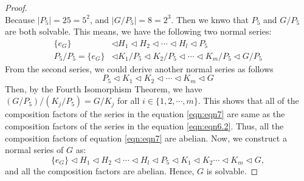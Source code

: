 \begin{answer}
\begin{proof}
\begin{equation}
        \end{equation}
        Because $\lvert P_5 \rvert = 25 = 5^2$, and $\lvert G/P_5 \rvert = 8 = 2^3$. Then we knwo that $P_5$ and $G/P_5$ are both solvable. This means, we have the following two normal series:
        \begin{equation}\label{eqn:eqn6.2}
            \begin{aligned}
                    \{e_G\} &\triangleleft H_1 \triangleleft H_2 \triangleleft \cdots \triangleleft H_l \triangleleft P_5\\
                    P_5/P_5 = \{e_G\} &\triangleleft K_1/P_5 \triangleleft K_2/P_5 \triangleleft \cdots \triangleleft K_m/P_5 \triangleleft G/P_5
             \end{aligned}
        \end{equation}
        From the second series, we could derive another normal series as follows
        \begin{equation}\label{eqn:eqn7}
            P_5 \triangleleft K_1 \triangleleft K_2 \triangleleft \cdots \triangleleft K_m \triangleleft G
        \end{equation}
        Then, by the Fourth Isomorphism Theorem, we have $(G/P_5)/(K_j/P_5) = G/K_j$ for all $i \in \{1,2,\cdots,m\}$. This shows that all of the composition factors of the series in the equation \ref{eqn:eqn7} are same as the composition factors of the series in the equation \ref{eqn:eqn6.2}. Thus, all the composition factors of equation \ref{eqn:eqn7} are abelian. Now, we construct a normal series of $G$ as:
        \begin{equation}
            \{e_G\} \triangleleft H_1 \triangleleft H_2 \triangleleft \cdots \triangleleft H_l \triangleleft P_5 \triangleleft K_1 \triangleleft K_2 \cdots \triangleleft K_m \triangleleft G,
        \end{equation}
        and all the composition factors are abelian. Hence, $G$ is solvable.
    \end{proof}
\end{answer}